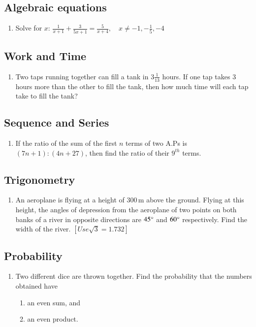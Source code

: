 \documentclass[12pt,letter paper]{article}
\providecommand{\brak}[1]{\ensuremath{\left(#1\right)}}
\providecommand{\sbrak}[1]{\ensuremath{{}\left[#1\right]}}
\begin{document}
\begin{center}
	\section*{Algebraic equations}
\end{center}
\begin{enumerate}
\item Solve for $x$:
$\frac{1}{x+1} + \frac{3}{5x+1} = \frac{5}{x+4}, \quad x \neq -1, -\frac{1}{5},-4$
\end{enumerate}
\begin{center}
	\section*{Work and Time}
\end{center}
\begin{enumerate}
    \item Two taps running together can fill a tank in $3\frac{1}{13}$ hours. If one tap takes $3$ hours more than the other to fill the tank, then how much time will each tap take to fill the tank?
\end{enumerate}
\begin{center}
	\section*{Sequence and Series}
\end{center}
\begin{enumerate}
	\item If the ratio of the sum of the first $n$ terms of two A.Ps is $\brak{7n + 1} : \brak{4n + 27}$, then find the ratio of their $9^{th}$ terms.
\end{enumerate}
\begin{center}
	\section*{Trigonometry}
\end{center}
\begin{enumerate}
	\item An aeroplane is flying at a height of $300\,\mathrm{m}$ above the ground. Flying at this height, the angles of depression from the aeroplane of two points on both banks of a river in opposite directions are $45\degree$ and $60\degree$ respectively. Find the width of the river.
		$\sbrak{Use \sqrt{3}=1.732}$
\end{enumerate}
\begin{center}
	\section*{Probability}
\end{center}
\begin{enumerate}
\item Two different dice are thrown together. Find the probability that the numbers obtained have
     \begin{enumerate}
        \item an even sum, and
        \item an even product.
    \end{enumerate}
\end{enumerate}
\end{document}
